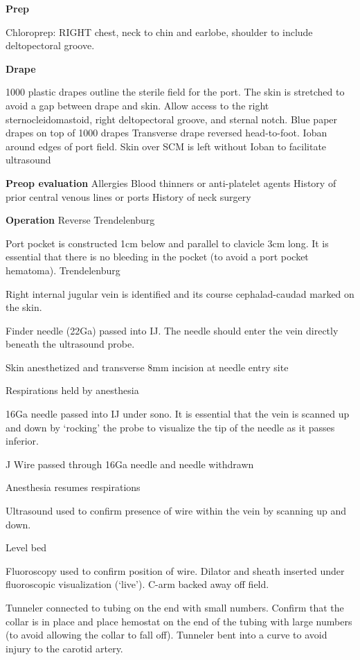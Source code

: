 \documentclass[
]{book}
\begin{document}
\textbf{Prep}

Chloroprep: RIGHT chest, neck to chin and earlobe, shoulder to include deltopectoral groove.

\textbf{Drape}

1000 plastic drapes outline the sterile field for the port. The skin is stretched to avoid a gap between drape and skin. Allow access to the right sternocleidomastoid, right deltopectoral groove, and sternal notch.
Blue paper drapes on top of 1000 drapes
Transverse drape reversed head-to-foot.
Ioban around edges of port field. Skin over SCM is left without Ioban to facilitate ultrasound

\textbf{Preop evaluation}
Allergies
Blood thinners or anti-platelet agents
History of prior central venous lines or ports
History of neck surgery

\textbf{Operation}
Reverse Trendelenburg

Port pocket is constructed 1cm below and parallel to clavicle 3cm long. It is essential that there is no bleeding in the pocket (to avoid a port pocket hematoma).
Trendelenburg

Right internal jugular vein is identified and its course cephalad-caudad marked on the skin.

Finder needle (22Ga) passed into IJ. The needle should enter the vein directly beneath the ultrasound probe.

Skin anesthetized and transverse 8mm incision at needle entry site

Respirations held by anesthesia

16Ga needle passed into IJ under sono. It is essential that the vein is scanned up and down by `rocking' the probe to visualize the tip of the needle as it passes inferior.

J Wire passed through 16Ga needle and needle withdrawn

Anesthesia resumes respirations

Ultrasound used to confirm presence of wire within the vein by scanning up and down.

Level bed

Fluoroscopy used to confirm position of wire. Dilator and sheath inserted under fluoroscopic visualization (`live'). C-arm backed away off field.

Tunneler connected to tubing on the end with small numbers. Confirm that the collar is in place and place hemostat on the end of the tubing with large numbers (to avoid allowing the collar to fall off). Tunneler bent into a curve to avoid injury to the carotid artery.
\end{document}
